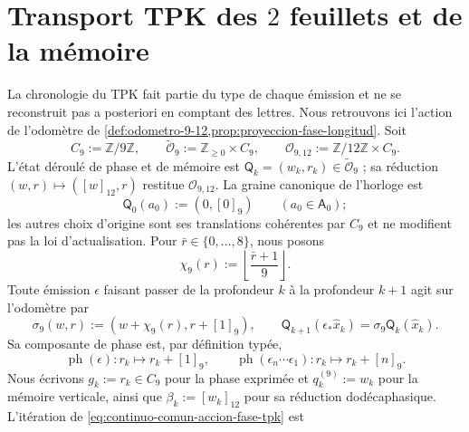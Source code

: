 \section{Transport TPK des \(2\) feuillets et de la mémoire}
\label{sec:continuo-comun-tpk-transporte}

La chronologie du TPK fait partie du type de chaque émission et ne se reconstruit pas a posteriori en comptant des lettres. Nous retrouvons ici l'action de l'odomètre de \cref{def:odometro-9-12,prop:proyeccion-fase-longitud}. Soit
\begin{equation}
\label{eq:continuo-comun-ciclo-fase-tpk}
 C_9:=\mathbb Z/9\mathbb Z,\qquad
 \widetilde{\mathcal O}_{9}:=\mathbb Z_{\geq0}\times C_9,\qquad
 \mathcal O_{9,12}:=\mathbb Z/12\mathbb Z\times C_9.
\end{equation}
L'état déroulé de phase et de mémoire est \(\mathsf Q_k=(w_k,r_k)\in\widetilde{\mathcal O}_{9}\) ; sa réduction \((w,r)\mapsto([w]_{12},r)\) restitue \(\mathcal O_{9,12}\). La graine canonique de l'horloge est
\begin{equation}
\label{eq:continuo-comun-semilla-fase-tpk}
 \mathsf Q_0(a_0):=(0,[0]_9)\qquad(a_0\in\mathsf A_0);
\end{equation}
les autres choix d'origine sont ses translations cohérentes par \(C_9\) et ne modifient pas la loi d'actualisation. Pour \(\bar r\in\{0,\ldots,8\}\), nous posons
\begin{equation}
\label{eq:continuo-comun-carry-fase-tpk}
 \chi_9(r):=\left\lfloor\frac{\bar r+1}{9}\right\rfloor.
\end{equation}
Toute émission \(\epsilon\) faisant passer de la profondeur \(k\) à la profondeur \(k+1\) agit sur l'odomètre par
\begin{equation}
\label{eq:continuo-comun-accion-fase-tpk}
 \sigma_9(w,r):=(w+\chi_9(r),r+[1]_9),\qquad
 \mathsf Q_{k+1}(\epsilon_*\widehat x_k)
 =\sigma_9\mathsf Q_k(\widehat x_k).
\end{equation}
Sa composante de phase est, par définition typée,
\begin{equation}
\label{eq:continuo-comun-fase-emision-tpk}
 \operatorname{ph}(\epsilon):r_k\longmapsto r_k+[1]_9,
 \qquad
 \operatorname{ph}(\epsilon_n\cdots\epsilon_1):
 r_k\longmapsto r_k+[n]_9.
\end{equation}
Nous écrivons \(g_k:=r_k\in C_9\) pour la phase exprimée et \(q^{(9)}_k:=w_k\) pour la mémoire verticale, ainsi que \(\beta_k:=[w_k]_{12}\) pour sa réduction dodécaphasique. L'itération de \eqref{eq:continuo-comun-accion-fase-tpk} est
